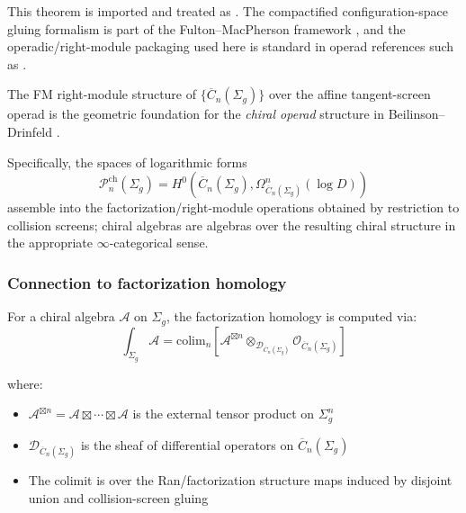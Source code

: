 \begin{remark}
This theorem is imported and treated as \ClaimStatusProvedElsewhere. The
compactified configuration-space gluing formalism is part of the
Fulton--MacPherson framework \cite{FM94}, and the operadic/right-module
packaging used here is standard in operad references such as \cite{LV12}.
\end{remark}

\begin{remark}\label{rem:chiral-operad}
The FM right-module structure of $\{\overline{C}_n(\Sigma_g)\}$ over
the affine tangent-screen operad is the geometric foundation for the
\emph{chiral operad} structure in Beilinson--Drinfeld \cite{BD04}.

Specifically, the spaces of logarithmic forms
\[\mathcal{P}^{\text{ch}}_n(\Sigma_g) = H^0(\overline{C}_n(\Sigma_g), \Omega^n_{\overline{C}_n(\Sigma_g)}(\log D))\]
assemble into the factorization/right-module operations obtained by
restriction to collision screens; chiral algebras are algebras over the
resulting chiral structure in the appropriate $\infty$-categorical
sense.
\end{remark}

\subsubsection{Connection to factorization homology}

\begin{theorem}\label{thm:fact-homology}
\label{thm:bar-factorization-homology}
For a chiral algebra $\mathcal{A}$ on $\Sigma_g$, the factorization homology is computed via:
\[\int_{\Sigma_g} \mathcal{A} = \text{colim}_n \left[ \mathcal{A}^{\boxtimes n} \otimes_{\mathcal{D}_{\overline{C}_n(\Sigma_g)}} \mathcal{O}_{\overline{C}_n(\Sigma_g)} \right]\]

where:
\begin{itemize}
\item $\mathcal{A}^{\boxtimes n} = \mathcal{A} \boxtimes \cdots \boxtimes \mathcal{A}$ is the external tensor product on $\Sigma_g^n$
\item $\mathcal{D}_{\overline{C}_n(\Sigma_g)}$ is the sheaf of differential operators on $\overline{C}_n(\Sigma_g)$
\item The colimit is over the Ran/factorization structure maps induced
by disjoint union and collision-screen gluing
\end{itemize}
\end{theorem}

